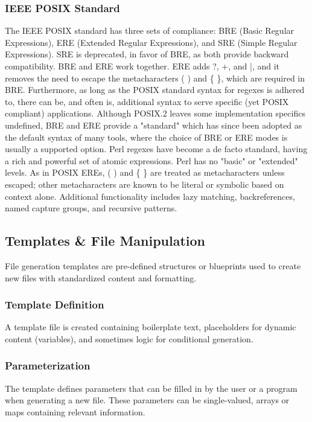 \subsubsection{IEEE POSIX Standard}
The IEEE POSIX standard has three sets of compliance: BRE (Basic Regular Expressions), ERE (Extended Regular Expressions), and SRE (Simple Regular Expressions). SRE is deprecated, in favor of BRE, as both provide backward compatibility.
BRE and ERE work together. ERE adds ?, +, and |, and it removes the need to escape the metacharacters ( ) and \{ \}, which are required in BRE. Furthermore, as long as the POSIX standard syntax for regexes is adhered to, there can be, and often is, additional syntax to serve specific (yet POSIX compliant) applications. Although POSIX.2 leaves some implementation specifics undefined, BRE and ERE provide a "standard" which has since been adopted as the default syntax of many tools, where the choice of BRE or ERE modes is usually a supported option.
Perl regexes have become a de facto standard, having a rich and powerful set of atomic expressions. Perl has no "basic" or "extended" levels. As in POSIX EREs, ( ) and \{ \} are treated as metacharacters unless escaped; other metacharacters are known to be literal or symbolic based on context alone. Additional functionality includes lazy matching, backreferences, named capture groups, and recursive patterns.

\subsection{Templates \& File Manipulation}
File generation templates are pre-defined structures or blueprints used to create new files with standardized content and formatting.
\subsubsection{Template Definition}
A template file is created containing boilerplate text, placeholders for dynamic content (variables), and sometimes logic for conditional generation.
\subsubsection{Parameterization}
The template defines parameters that can be filled in by the user or a program when generating a new file. These parameters can be single-valued, arrays or maps containing relevant information.
